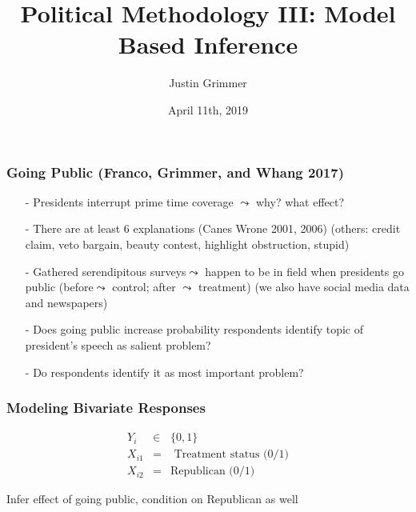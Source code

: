 \documentclass{beamer}
\title[Methodology III] %
{Political Methodology III: Model Based Inference}
\author{Justin Grimmer}
\institute[Stanford University]{Professor\\Department of Political Science \\  Stanford University}
\date{April 11th, 2019}
\begin{document}
\begin{frame}
\titlepage
\end{frame}


\begin{frame}


\end{frame}

\begin{frame}
\frametitle{Going Public (Franco, Grimmer, and Whang 2017)}

\begin{itemize}
\item[-] Presidents interrupt prime time coverage $\leadsto$ why? what effect?
\item[-] There are at least 6 explanations (Canes Wrone 2001, 2006) (others: credit claim, veto bargain, beauty contest, highlight obstruction, stupid)
\item[-] Gathered serendipitous surveys$\leadsto$ happen to be in field when presidents go public (before$\leadsto$ control; after $\leadsto$ treatment) (we also have social media data and newspapers)
\item[-] Does going public increase probability respondents identify topic of president's speech as salient problem?
\item[-] Do respondents identify it as most important problem?
\end{itemize}



\end{frame}






\begin{frame}
\frametitle{Modeling Bivariate Responses}

\begin{eqnarray}
Y_{i} & \in &  \{0, 1\} \nonumber \\
X_{i1} & = & \text{ Treatment status (0/1)}  \nonumber \\
X_{i2} & = & \text{Republican (0/1)} \nonumber
\end{eqnarray}

Infer effect of going public, condition on Republican as well  \\

\pause
{}


\end{frame}
\end{document}
